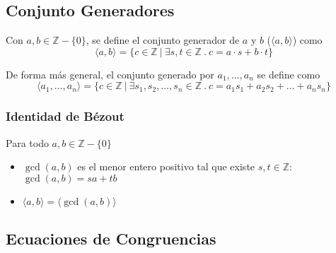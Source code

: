 \documentclass[../main.tex]{subfiles}
\begin{document}
\subsection{Conjunto Generadores}
Con $a,b \in \mathds{Z} - \{0\}$, se define el conjunto generador de $a$ y $b$ ($\langle a,b \rangle$) como
\[ \langle a,b \rangle = \{ c \in \mathds{Z}\ |\ \exists s,t \in \mathds{Z}\ .\ c = a \cdot s + b \cdot t \} \]

De forma más general, el conjunto generado por $a_1, \ldots, a_n$ se define como
\[ \langle a_1, \ldots, a_n \rangle = \{ c \in \mathds{Z}\ |\ \exists s_1,s_2,\ldots,s_n \in \mathds{Z}\ .\ c = a_1 s_1 + a_2 s_2 + \ldots + a_n s_n \} \]

\subsubsection{Identidad de Bézout}
Para todo $a,b \in \mathds{Z} - \{0\}$
\begin{itemize}
    \item $\gcd(a,b)$ es el menor entero positivo tal que existe $s,t \in \mathds{Z}$: $\gcd(a,b) = sa + tb$
    \item $\langle a,b \rangle = \langle \gcd(a,b) \rangle$
\end{itemize}

\subsection{Ecuaciones de Congruencias}
\end{document}
